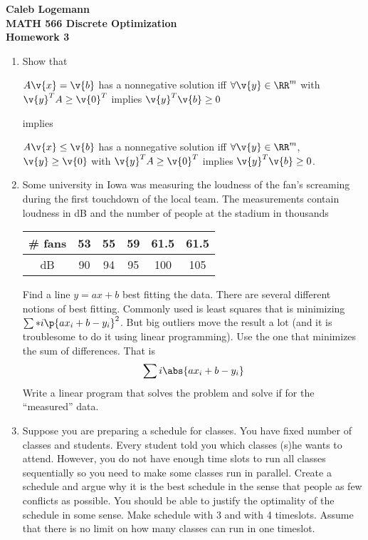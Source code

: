 \documentclass[11pt, oneside]{article}
\begin{document}
\noindent \textbf{\Large{Caleb Logemann \\
MATH 566 Discrete Optimization\\
Homework 3
}}

%
\begin{enumerate}
    \item %
        Show that
        \begin{center}
            $A\v{x} = \v{b}$ has a nonnegative solution iff
            $\forall \v{y} \in \RR^m$ with $\v{y}^T A \ge \v{0}^T$ implies
            $\v{y}^T \v{b} \ge 0$
        \end{center}
        implies
        \begin{center}
            $A\v{x} \le \v{b}$ has a nonnegative solution iff
            $\forall \v{y} \in \RR^m$, $\v{y} \ge \v{0}$ with $\v{y}^T A \ge \v{0}^T$
            implies $\v{y}^T \v{b} \ge 0$.
        \end{center}

    \item %
        Some university in Iowa was measuring the loudness of the fan’s
        screaming during the first touchdown of the local team.
        The measurements contain loudness in dB and the number of people at the
        stadium in thousands
        \begin{center}
            \begin{tabular}{*{6}c}
                \toprule
                \# fans & 53 & 55 & 59 & 61.5 & 61.5 \\
                \midrule
                dB     & 90 & 94 & 95 &  100 &  105 \\
                \bottomrule
            \end{tabular}
        \end{center}
        Find a line $y = ax + b$ best fitting the data.
        There are several different notions of best fitting.
        Commonly used is least squares that is minimizing $\sum*{i}{}{\p{ax_i + b - y_i}^2}$.
        But big outliers move the result a lot (and it is troublesome to do it
        using linear programming).
        Use the one that minimizes the sum of differences. That is
        \[
            \sum{i}{}{\abs{a x_i + b - y_i}}
        \]
        Write a linear program that solves the problem and solve if for the
        ``measured'' data.

    \item %
        Suppose you are preparing a schedule for classes.
        You have fixed number of classes and students.
        Every student told you which classes (s)he wants to attend.
        However, you do not have enough time slots to run all classes
        sequentially so you need to make some classes run in parallel.
        Create a schedule and argue why it is the best schedule in the sense
        that people as few conflicts as possible.
        You should be able to justify the optimality of the schedule in some sense.
        Make schedule with 3 and with 4 timeslots.
        Assume that there is no limit on how many classes can run in one timeslot.


\end{enumerate}
\end{document}
